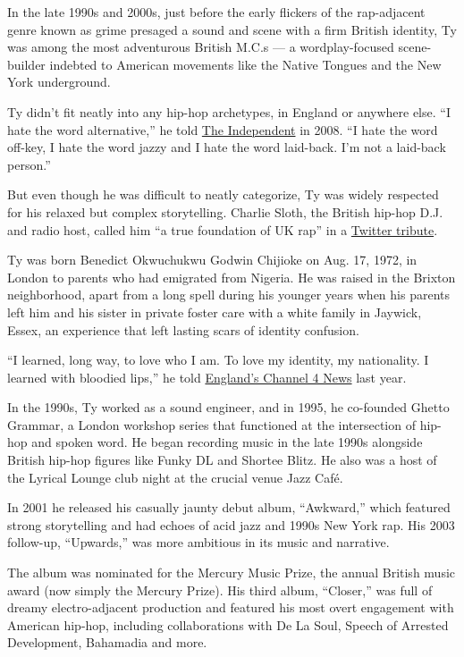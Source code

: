 In the late 1990s and 2000s, just before the early flickers of the
rap-adjacent genre known as grime presaged a sound and scene with a firm
British identity, Ty was among the most adventurous British M.C.s --- a
wordplay-focused scene-builder indebted to American movements like the
Native Tongues and the New York underground.

Ty didn't fit neatly into any hip-hop archetypes, in England or anywhere
else. ``I hate the word alternative,'' he told
\href{https://www.independent.co.uk/arts-entertainment/music/features/ty-hip-hop-has-no-culture-856859.html}{The
Independent} in 2008. ``I hate the word off-key, I hate the word jazzy
and I hate the word laid-back. I'm not a laid-back person.''

But even though he was difficult to neatly categorize, Ty was widely
respected for his relaxed but complex storytelling. Charlie Sloth, the
British hip-hop D.J. and radio host, called him ``a true foundation of
UK rap'' in a
\href{https://twitter.com/CharlieSloth/status/1258482571219959818?s=20}{Twitter
tribute}.

Ty was born Benedict Okwuchukwu Godwin Chijioke on Aug. 17, 1972, in
London to parents who had emigrated from Nigeria. He was raised in the
Brixton neighborhood, apart from a long spell during his younger years
when his parents left him and his sister in private foster care with a
white family in Jaywick, Essex, an experience that left lasting scars of
identity confusion.

``I learned, long way, to love who I am. To love my identity, my
nationality. I learned with bloodied lips,'' he told
\href{https://www.channel4.com/news/the-west-african-children-brought-up-by-white-foster-families-in-the-english-countryside}{England's
Channel 4 News} last year.

In the 1990s, Ty worked as a sound engineer, and in 1995, he co-founded
Ghetto Grammar, a London workshop series that functioned at the
intersection of hip-hop and spoken word. He began recording music in the
late 1990s alongside British hip-hop figures like Funky DL and Shortee
Blitz. He also was a host of the Lyrical Lounge club night at the
crucial venue Jazz Café.

In 2001 he released his casually jaunty debut album, ``Awkward,'' which
featured strong storytelling and had echoes of acid jazz and 1990s New
York rap. His 2003 follow-up, ``Upwards,'' was more ambitious in its
music and narrative.

The album was nominated for the Mercury Music Prize, the annual British
music award (now simply the Mercury Prize). His third album, ``Closer,''
was full of dreamy electro-adjacent production and featured his most
overt engagement with American hip-hop, including collaborations with De
La Soul, Speech of Arrested Development, Bahamadia and more.

